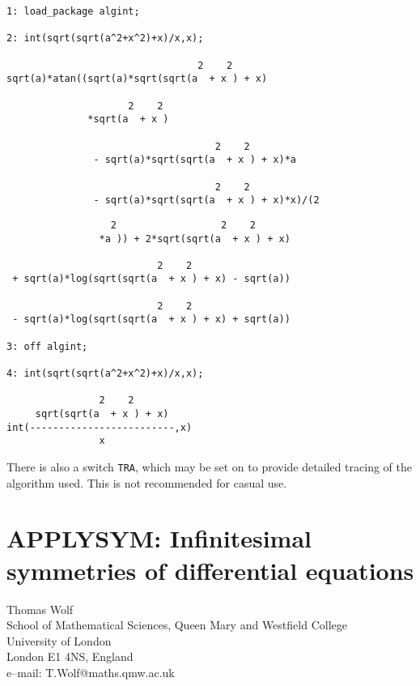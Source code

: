 \documentclass[11pt,letterpaper]{book}
\makeatletter
\newcommand{\underscore}{\_}
\newcommand{\ttindex}[1]{{\renewcommand{\_}{\protect\underscore}%
                          \index{#1@{\tt #1}}}}
\makeatother
\begin{document}
{\small\begin{verbatim}
1: load_package algint;

2: int(sqrt(sqrt(a^2+x^2)+x)/x,x);

                                 2    2
sqrt(a)*atan((sqrt(a)*sqrt(sqrt(a  + x ) + x)

                     2    2
              *sqrt(a  + x )

                                    2    2
               - sqrt(a)*sqrt(sqrt(a  + x ) + x)*a

                                    2    2
               - sqrt(a)*sqrt(sqrt(a  + x ) + x)*x)/(2
\end{verbatim}}
\newpage
{\small\begin{verbatim}
                  2                  2    2
                *a )) + 2*sqrt(sqrt(a  + x ) + x)

                          2    2
 + sqrt(a)*log(sqrt(sqrt(a  + x ) + x) - sqrt(a))

                          2    2
 - sqrt(a)*log(sqrt(sqrt(a  + x ) + x) + sqrt(a))

3: off algint;

4: int(sqrt(sqrt(a^2+x^2)+x)/x,x);

                2    2
     sqrt(sqrt(a  + x ) + x)
int(-------------------------,x)
                x

\end{verbatim}}

There is also a switch {\tt TRA},\ttindex{TRA} which may be set on to
provide detailed tracing of the algorithm used.  This is not
recommended for casual use.

\chapter[APPLYSYM: Infinitesimal symmetries]{APPLYSYM: Infinitesimal symmetries of differential equations}
\label{APPLYSYM}

{\footnotesize
\begin{center}
Thomas Wolf \\
School of Mathematical Sciences, Queen Mary and Westfield College \\
University of London \\
London E1 4NS, England \\[0.05in]
e--mail: T.Wolf@maths.qmw.ac.uk
\end{center}
}
\end{document}
